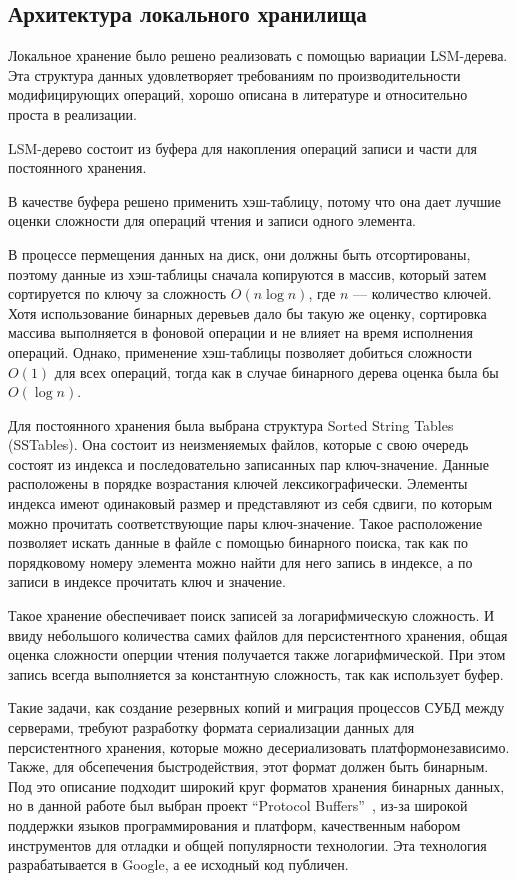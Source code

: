 \documentclass[14pt, russian]{scrartcl}
\begin{document}
\subsection{Архитектура локального хранилища}

Локальное хранение было решено реализовать с помощью вариации LSM-дерева. Эта
структура данных удовлетворяет требованиям по производительности модифицирующих
операций, хорошо описана в литературе и относительно проста в реализации.

LSM-дерево состоит из буфера для накопления операций записи и части для
постоянного хранения.

В качестве буфера решено применить хэш-таблицу, потому что она дает лучшие
оценки сложности для операций чтения и записи одного элемента.

В процессе пермещения данных на диск, они должны быть отсортированы, поэтому
данные из хэш-таблицы сначала копируются в массив, который затем сортируется по
ключу за сложность $O(n\log n)$, где $n$ --- количество ключей. Хотя
использование бинарных деревьев дало бы такую же оценку, сортировка массива
выполняется в фоновой операции и не влияет на время исполнения операций. Однако,
применение хэш-таблицы позволяет добиться сложности $O(1)$ для всех операций,
тогда как в случае бинарного дерева оценка была бы $O(\log n)$.

Для постоянного хранения была выбрана структура Sorted String Tables (SSTables).
Она состоит из неизменяемых файлов, которые с свою очередь состоят из индекса и
последовательно записанных пар ключ-значение. Данные расположены в порядке
возрастания ключей лексикографически. Элементы индекса имеют одинаковый размер и
представляют из себя сдвиги, по которым можно прочитать соответствующие пары
ключ-значение. Такое расположение позволяет искать данные в файле с помощью
бинарного поиска, так как по порядковому номеру элемента можно найти для него
запись в индексе, а по записи в индексе прочитать ключ и значение.

Такое хранение обеспечивает поиск записей за логарифмическую сложность. И ввиду
небольшого количества самих файлов для персистентного хранения, общая оценка
сложности оперции чтения получается также логарифмической. При этом запись
всегда выполняется за константную сложность, так как использует буфер.

Такие задачи, как создание резервных копий и миграция процессов СУБД между
серверами, требуют разработку формата сериализации данных для персистентного
хранения, которые можно десериализовать платформонезависимо. Также, для
обсепечения быстродействия, этот формат должен быть бинарным. Под это описание
подходит широкий круг форматов хранения бинарных данных, но в данной работе был
выбран проект ``Protocol Buffers''~\cite{protobufs}, из-за широкой поддержки
языков программирования и платформ, качественным набором инструментов для
отладки и общей популярности технологии. Эта технология разрабатывается в
Google, а ее исходный код публичен.
\end{document}
